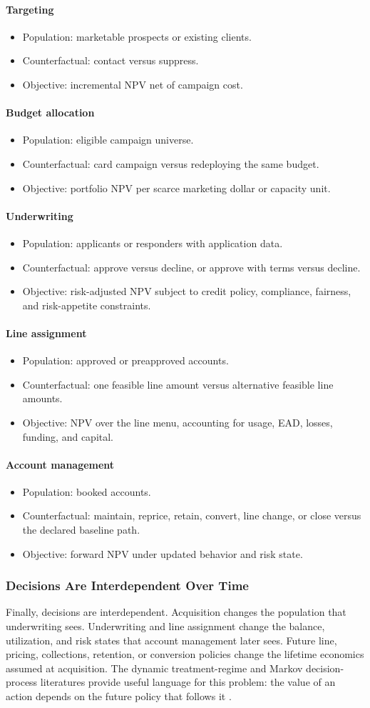 \documentclass[11pt]{article}
\newcommand{\1}{\mathbf{1}}
\newcommand{\contractitem}[2]{\paragraph{#1}\begin{itemize}[leftmargin=1.5em,itemsep=0.12em,topsep=0.18em]#2\end{itemize}}
\begin{document}
\contractitem{Targeting}{
  \item Population: marketable prospects or existing clients.
  \item Counterfactual: contact versus suppress.
  \item Objective: incremental NPV net of campaign cost.
}
\contractitem{Budget allocation}{
  \item Population: eligible campaign universe.
  \item Counterfactual: card campaign versus redeploying the same budget.
  \item Objective: portfolio NPV per scarce marketing dollar or capacity unit.
}
\contractitem{Underwriting}{
  \item Population: applicants or responders with application data.
  \item Counterfactual: approve versus decline, or approve with terms versus
        decline.
  \item Objective: risk-adjusted NPV subject to credit policy, compliance,
        fairness, and risk-appetite constraints.
}
\contractitem{Line assignment}{
  \item Population: approved or preapproved accounts.
  \item Counterfactual: one feasible line amount versus alternative feasible
        line amounts.
  \item Objective: NPV over the line menu, accounting for usage, EAD, losses,
        funding, and capital.
}
\contractitem{Account management}{
  \item Population: booked accounts.
  \item Counterfactual: maintain, reprice, retain, convert, line change, or
        close versus the declared baseline path.
  \item Objective: forward NPV under updated behavior and risk state.
}

\subsubsection{Decisions Are Interdependent Over Time}
\label{subsec:interdependent-decisions}

Finally, decisions are interdependent. Acquisition changes the population that
underwriting sees. Underwriting and line assignment change the balance,
utilization, and risk states that account management later sees. Future line,
pricing, collections, retention, or conversion policies change the lifetime
economics assumed at acquisition. The dynamic treatment-regime and Markov
decision-process literatures provide useful language for this problem:
the value of an action depends on the future policy that follows it
\citep{puterman1994mdp,murphy2003dynamic,rust1987replacement}.
\end{document}
